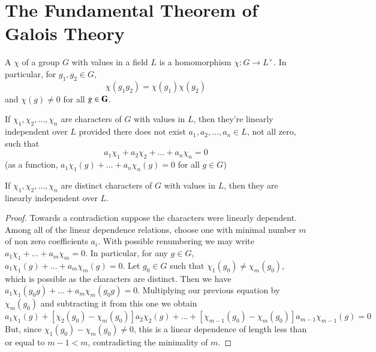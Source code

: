 \section{ The Fundamental Theorem of Galois Theory}

\begin{definition}
    A  $\chi$ of a group $G$ with values in a field $L$ is a homomorphism $\chi:G\rightarrow L^{\times}$. In particular, for $g_1,g_2 \in G$, \begin{equation*}
        \chi(g_1g_2) = \chi(g_1)\chi(g_2)
    \end{equation*}
    and $\chi(g) \neq 0$ for all $g \in \mathbf{G}$.
\end{definition}

\begin{definition}
    If $\chi_1,\chi_2,...,\chi_n$ are characters of $G$ with values in $L$, then they're linearly independent over $L$ provided there does not exist $a_1,a_2,...,a_n \in L$, not all zero, such that \begin{equation*}
        a_1\chi_1+a_2\chi_2+...+a_n\chi_n = 0
    \end{equation*}
    (as a function, $a_1\chi_1(g)+...+a_n\chi_n(g) = 0$ for all $g \in G$)
\end{definition}


\begin{theorem}
    If $\chi_1,\chi_2,...,\chi_n$ are distinct characters of $G$ with values in $L$, then they are linearly independent over $L$.
\end{theorem}
\begin{proof}
    Towards a contradiction suppose the characters were linearly dependent. Among all of the linear dependence relations, choose one with minimal number $m$ of non zero coefficients $a_i$. With possible renumbering we may write $a_1\chi_1+...+a_m\chi_m = 0$. In particular, for any $g \in G$, $a_1\chi_1(g) + ... + a_m\chi_m(g) = 0$. Let $g_0 \in G$ such that $\chi_1(g_0) \neq \chi_m(g_0)$, which is possible as the characters are distinct. Then we have $a_1\chi_1(g_0g)+...+a_m\chi_m(g_0g) = 0$. Multiplying our previous equation by $\chi_m(g_0)$ and subtracting it from this one we obtain \begin{equation*}
        [\chi_1(g_0) - \chi_m(g_0)]a_1\chi_1(g)+[\chi_2(g_0)-\chi_m(g_0)]a_2\chi_2(g)+...+[\chi_{m-1}(g_0)-\chi_m(g_0)]a_{m-1}\chi_{m-1}(g) = 0
    \end{equation*}
    But, since $\chi_1(g_0) - \chi_m(g_0) \neq 0$, this is a linear dependence of length less than or equal to $m-1 < m$, contradicting the minimality of $m$.
\end{proof}
    

